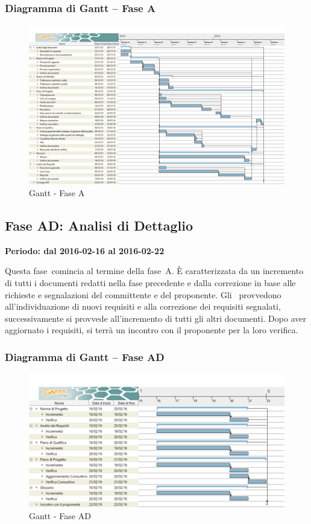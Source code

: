 \documentclass[../PianoProgetto.tex]{subfiles}
\begin{document}
		\subsubsection{Diagramma di Gantt – Fase A}
			\begin{figure}[!h]
				\centering
				\includegraphics[width=\textwidth]{gantt_png/1-analisi}
				\caption{Gantt - Fase A}
				\label{fig:Gantt - Fase A}
			\end{figure}			
	
	\subsection{Fase AD: Analisi di Dettaglio}
		\textbf{Periodo: dal 2016-02-16 al 2016-02-22}

				Questa fase\g\ comincia al termine della fase\g\ A. È caratterizzata da un incremento di tutti i documenti redatti nella fase precedente e dalla correzione in base alle richieste e segnalazioni del committente e del proponente. Gli \analisti\ provvedono all'individuazione di nuovi requisiti e alla correzione dei requisiti segnalati, successivamente si provvede all'incremento di tutti gli altri documenti. Dopo aver aggiornato i requisiti, si terrà un incontro con il proponente per la loro verifica.
		\newpage			
		\subsubsection{Diagramma di Gantt – Fase AD}
			\begin{figure}[!h]
				\centering
				\includegraphics[width=\textwidth]{gantt_png/2-analisi_di_dettaglio}
				\caption{Gantt - Fase AD}
				\label{fig:Gantt - Fase AD}
			\end{figure}
\end{document}
